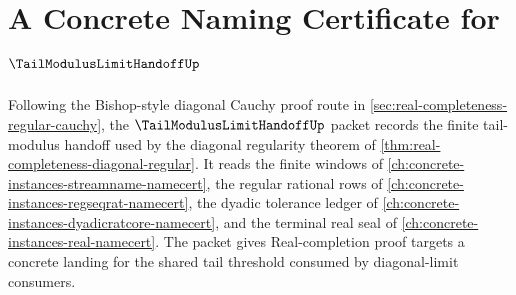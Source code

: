 \chapter{A Concrete Naming Certificate for $\TailModulusLimitHandoffUp$}
\label{ch:concrete-instances-tail-modulus-limit-handoff-namecert}

Following the Bishop-style diagonal Cauchy proof route in \autoref{sec:real-completeness-regular-cauchy}, the $\TailModulusLimitHandoffUp$ packet records the finite tail-modulus handoff used by the diagonal regularity theorem of \autoref{thm:real-completeness-diagonal-regular}. It reads the finite windows of \autoref{ch:concrete-instances-streamname-namecert}, the regular rational rows of \autoref{ch:concrete-instances-regseqrat-namecert}, the dyadic tolerance ledger of \autoref{ch:concrete-instances-dyadicratcore-namecert}, and the terminal real seal of \autoref{ch:concrete-instances-real-namecert}. The packet gives Real-completion proof targets a concrete landing for the shared tail threshold consumed by diagonal-limit consumers.

